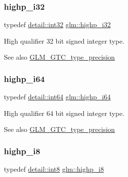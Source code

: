 \subsubsection{\texorpdfstring{highp\+\_\+i32}{highp\_i32}}
{\footnotesize\ttfamily typedef \hyperlink{namespaceglm_1_1detail_a9f85b4efeca416cdcec2fd08939a2e17}{detail\+::int32} \hyperlink{group__gtc__type__precision_ga197d19b585222da57d70238a5cfc2be8}{glm\+::highp\+\_\+i32}}

High qualifier 32 bit signed integer type. \begin{DoxySeeAlso}{See also}
\hyperlink{group__gtc__type__precision}{G\+L\+M\+\_\+\+G\+T\+C\+\_\+type\+\_\+precision} 
\end{DoxySeeAlso}
\mbox{\label{group__gtc__type__precision_gad3cb9a0ac0266ea2c51c6fac256345d1}} 
\subsubsection{\texorpdfstring{highp\+\_\+i64}{highp\_i64}}
{\footnotesize\ttfamily typedef \hyperlink{namespaceglm_1_1detail_a5b1c3227ec636c24a0676746381adfc8}{detail\+::int64} \hyperlink{group__gtc__type__precision_gad3cb9a0ac0266ea2c51c6fac256345d1}{glm\+::highp\+\_\+i64}}

High qualifier 64 bit signed integer type. \begin{DoxySeeAlso}{See also}
\hyperlink{group__gtc__type__precision}{G\+L\+M\+\_\+\+G\+T\+C\+\_\+type\+\_\+precision} 
\end{DoxySeeAlso}
\mbox{\label{group__gtc__type__precision_ga8b9eb0b24cce7f14478bfcacb53ce839}} 
\subsubsection{\texorpdfstring{highp\+\_\+i8}{highp\_i8}}
{\footnotesize\ttfamily typedef \hyperlink{namespaceglm_1_1detail_a04b526a8d7a9b455602a0afa78c531e0}{detail\+::int8} \hyperlink{group__gtc__type__precision_ga8b9eb0b24cce7f14478bfcacb53ce839}{glm\+::highp\+\_\+i8}}

